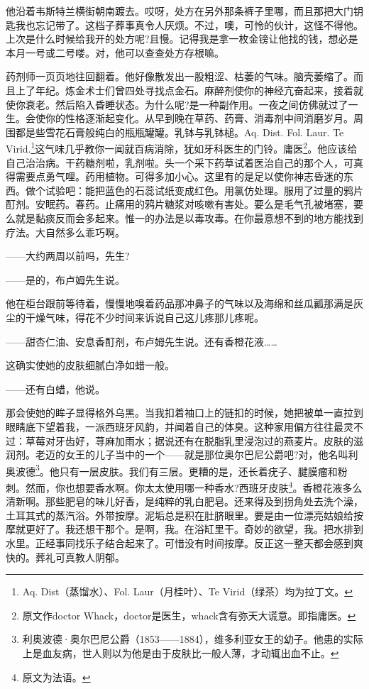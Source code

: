 \par 他沿着韦斯特兰横街朝南踱去。哎呀，处方在另外那条裤子里哪，而且那把大门钥匙我也忘记带了。这档子葬事真令人厌烦。不过，噢，可怜的伙计，这怪不得他。上次是什么时候给我开的处方呢?且慢。记得我是拿一枚金镑让他找的钱，想必是本月一号或二号喽。对，他可以查查处方存根嘛。
\par 药剂师一页页地往回翻着。他好像散发出一股粗涩、枯萎的气味。脑壳萎缩了。而且上了年纪。炼金术士们曾四处寻找点金石。麻醉剂使你的神经亢奋起来，接着就使你衰老。然后陷入昏睡状态。为什么呢?是一种副作用。一夜之间仿佛就过了一生。会使你的性格逐渐起变化。从早到晚在草药、药膏、消毒剂中间消磨岁月。周围都是些雪花石膏般纯白的瓶瓶罐罐。乳钵与乳钵槌。Aq. Dist. Fol. Laur. Te Virid.\footnote{Aq. Dist（蒸馏水）、Fol. Laur（月桂叶）、Te Virid（绿茶）均为拉丁文。}这气味几乎教你一闻就百病消除，犹如牙科医生的门铃。庸医\footnote{原文作doctor Whack，doctor是医生，whack含有弥天大谎意。即指庸医。}。他应该给自己治治病。干药糖剂啦，乳剂啦。头一个采下药草试着医治自己的那个人，可真得需要点勇气哩。药用植物。可得多加小心。这里有的是足以使你神志昏迷的东西。做个试验吧：能把蓝色的石蕊试纸变成红色。用氯仿处理。服用了过量的鸦片酊剂。安眠药。春药。止痛用的鸦片糖浆对咳嗽有害处。要么是毛气孔被堵塞，要么就是黏痰反而会多起来。惟一的办法是以毒攻毒。在你最意想不到的地方能找到疗法。大自然多么乖巧啊。
\par ——大约两周以前吗，先生?
\par ——是的，布卢姆先生说。
\par 他在柜台跟前等待着，慢慢地嗅着药品那冲鼻子的气味以及海绵和丝瓜瓤那满是灰尘的干燥气味，得花不少时间来诉说自己这儿疼那儿疼呢。
\par ——甜杏仁油、安息香酊剂，布卢姆先生说。还有香橙花液……
\par 这确实使她的皮肤细腻白净如蜡一般。
\par ——还有白蜡，他说。
\par 那会使她的眸子显得格外乌黑。当我扣着袖口上的链扣的时候，她把被单一直拉到眼睛底下望着我，一派西班牙风韵，并闻着自己的体臭。这种家用偏方往往最灵不过：草莓对牙齿好，荨麻加雨水；据说还有在脱脂乳里浸泡过的燕麦片。皮肤的滋润剂。老迈的女王的儿子当中的一个——就是那位奥尔巴尼公爵吧?对，他名叫利奥波德\footnote{利奥波德·奥尔巴尼公爵（1853——1884），维多利亚女王的幼子。他患的实际上是血友病，世人则以为他是由于皮肤比一般人薄，才动辄出血不止。}。他只有一层皮肤。我们有三层。更糟的是，还长着疣子、腱膜瘤和粉刺。然而，你也想要香水啊。你太太使用哪一种香水?西班牙皮肤\footnote{原文为法语。}。香橙花液多么清新啊。那些肥皂的味儿好香，是纯粹的乳白肥皂。还来得及到拐角处去洗个澡，土耳其式的蒸汽浴。外带按摩。泥垢总是积在肚脐眼里。要是由一位漂亮姑娘给按摩就更好了。我还想干那个。是啊，我。在浴缸里干。奇妙的欲望，我。把水排到水里。正经事同找乐子结合起来了。可惜没有时间按摩。反正这一整天都会感到爽快的。葬礼可真教人阴郁。

